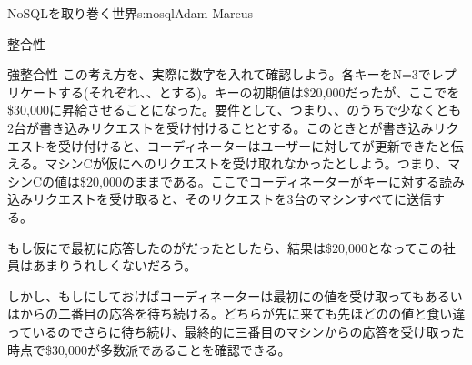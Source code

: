 \begin{aosachapter}{NoSQLを取り巻く世界}{s:nosql}{Adam Marcus}
\begin{aosasect1}{整合性}
\begin{aosasect2}{強整合性}
この考え方を、実際に数字を入れて確認しよう。各キーをN=3でレプリケートする(それぞれ、、とする)。キーの初期値は\$20,000だったが、ここでを\$30,000に昇給させることになった。要件として、つまり、、のうちで少なくとも2台が書き込みリクエストを受け付けることとする。このときとが書き込みリクエストを受け付けると、コーディネーターはユーザーに対してが更新できたと伝える。マシンCが仮にへのリクエストを受け取れなかったとしよう。つまり、マシンCの値は\$20,000のままである。ここでコーディネーターがキーに対する読み込みリクエストを受け取ると、そのリクエストを3台のマシンすべてに送信する。

\begin{aosaitemize}

  \item もし仮にで最初に応答したのがだったとしたら、結果は\$20,000となってこの社員はあまりうれしくないだろう。

  \item しかし、もしにしておけばコーディネーターは最初にの値を受け取ってもあるいはからの二番目の応答を待ち続ける。どちらが先に来ても先ほどのの値と食い違っているのでさらに待ち続け、最終的に三番目のマシンからの応答を受け取った時点で\$30,000が多数派であることを確認できる。


\end{aosaitemize}
\end{aosasect2}
\end{aosasect1}
\end{aosachapter}
